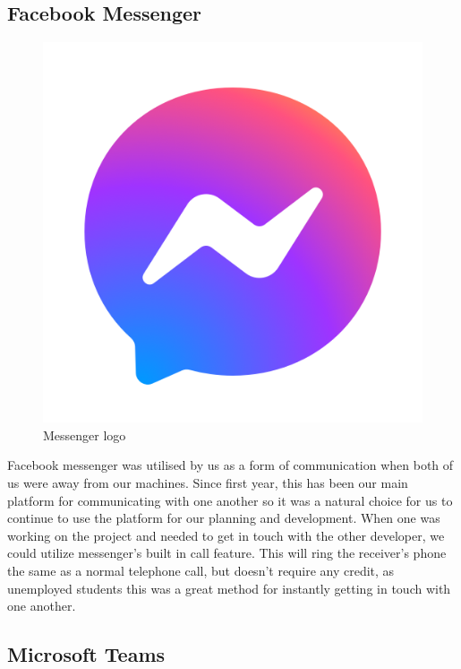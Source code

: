 \subsection{Facebook Messenger}
\begin{figure}[ht]
\renewcommand\thefigure{3.19}
\centering
\includegraphics[scale=0.3]{img/messenger.png}
\caption{Messenger logo}
\label{MessengerLogo}
\end{figure}

Facebook messenger was utilised by us as a form of communication when both of us were away from our machines. Since first year, this has been our main platform for communicating with one another so it was a natural choice for us to continue to use the platform for our planning and development. When one was working on the project and needed to get in touch with the other developer, we could utilize messenger's built in call feature. This will ring the receiver's phone the same as a normal telephone call, but doesn't require any credit, as unemployed students this was a great method for instantly getting in touch with one another.

\subsection{Microsoft Teams}

